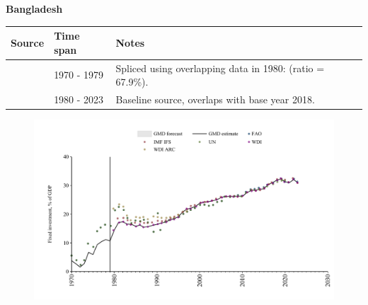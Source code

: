 \documentclass[12pt,a4paper,landscape]{article}
\begin{document}
\begin{adjustbox}{max totalsize={\paperwidth}{\paperheight},center}
\begin{minipage}[t][\textheight][t]{\textwidth}
\vspace*{0.5cm}
{}
\begin{center}
{\Large\bfseries Bangladesh}
\end{center}
\vspace{0.5cm}
\begin{table}[H]
\centering
\small
\begin{tabular}{|l|l|l|}
\hline
\textbf{Source} & \textbf{Time span} & \textbf{Notes} \\
\hline
\rowcolor{white}\cite{UN}& 1970 - 1979 &Spliced using overlapping data in 1980: (ratio = 67.9\%).\\
\rowcolor{lightgray}\cite{WDI}& 1980 - 2023 &Baseline source, overlaps with base year 2018.\\
\hline
\end{tabular}
\end{table}
\begin{figure}[H]
\centering
\includegraphics[width=\textwidth,height=0.6\textheight,keepaspectratio]{graphs/BGD_finv_GDP.pdf}
\end{figure}
\end{minipage}
\end{adjustbox}
\end{document}
